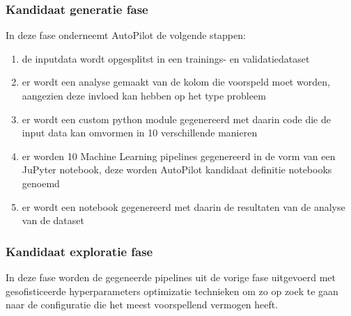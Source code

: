 \subsubsection{Kandidaat generatie fase}
In deze fase onderneemt AutoPilot de volgende stappen: 
\begin{enumerate}
    \item de inputdata wordt opgesplitst in een trainings- en validatiedataset
    \item er wordt een analyse gemaakt van de kolom die voorspeld moet worden, aangezien deze invloed kan hebben op het type probleem
    \item er wordt een custom python module gegenereerd met daarin code die de input data kan omvormen in 10 verschillende manieren
    \item er worden 10 Machine Learning pipelines gegenereerd in de vorm van een JuPyter notebook, deze worden AutoPilot kandidaat definitie notebooks genoemd
    \item er wordt een notebook gegenereerd met daarin de resultaten van de analyse van de dataset
\end{enumerate}

\subsubsection{Kandidaat exploratie fase}
In deze fase worden de gegeneerde pipelines uit de vorige fase uitgevoerd met gesofisticeerde hyperparameters optimizatie technieken om zo op zoek te gaan naar de configuratie die het meest voorspellend vermogen heeft. 

\autocite{Das2020}

